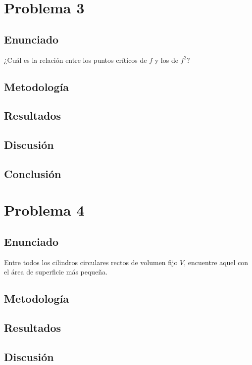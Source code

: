 \documentclass{article}
\begin{document}
\section{Problema 3}

\subsection{Enunciado}
¿Cuál es la relación entre los puntos críticos de $f$ y los de $f^{2}$?

\subsection{Metodología}

\subsection{Resultados}
\setcounter{equation}{0}

\subsection{Discusión}

\subsection{Conclusión}

\section{Problema 4}

\subsection{Enunciado}
Entre todos los cilindros circulares rectos de volumen fijo $V$, encuentre aquel con el área de superficie más pequeña.

\subsection{Metodología}

\subsection{Resultados}
\setcounter{equation}{0}

\subsection{Discusión}
\end{document}
